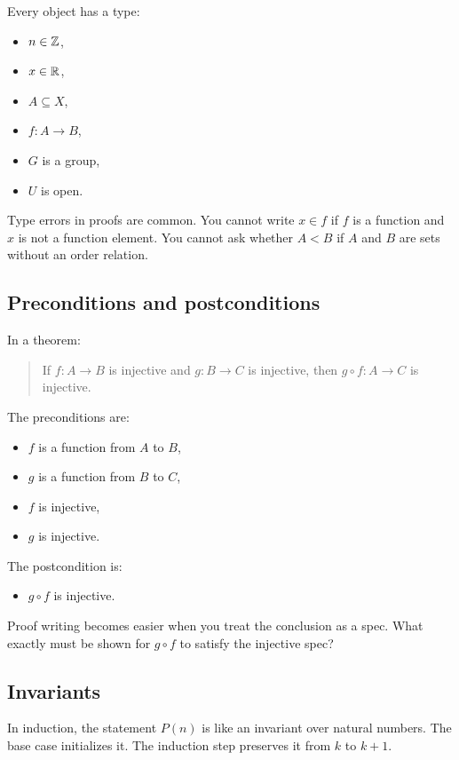 \documentclass[12pt]{article}
\begin{document}
Every object has a type:

\begin{itemize}
\item $n\in\mathbb{Z}$,
\item $x\in\mathbb{R}$,
\item $A\subseteq X$,
\item $f:A\to B$,
\item $G$ is a group,
\item $U$ is open.
\end{itemize}

Type errors in proofs are common. You cannot write $x\in f$ if $f$ is a function and $x$ is not a function element. You cannot ask whether $A< B$ if $A$ and $B$ are sets without an order relation.

\subsection{Preconditions and postconditions}

In a theorem:

\begin{quote}
If $f:A\to B$ is injective and $g:B\to C$ is injective, then $g\circ f:A\to C$ is injective.
\end{quote}

The preconditions are:

\begin{itemize}
\item $f$ is a function from $A$ to $B$,
\item $g$ is a function from $B$ to $C$,
\item $f$ is injective,
\item $g$ is injective.
\end{itemize}

The postcondition is:

\begin{itemize}
\item $g\circ f$ is injective.
\end{itemize}

Proof writing becomes easier when you treat the conclusion as a spec. What exactly must be shown for $g\circ f$ to satisfy the injective spec?

\subsection{Invariants}

In induction, the statement $P(n)$ is like an invariant over natural numbers. The base case initializes it. The induction step preserves it from $k$ to $k+1$.
\end{document}
